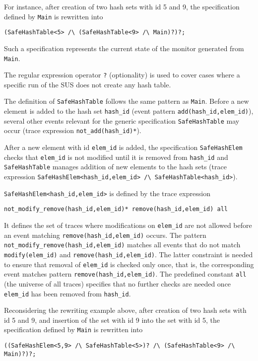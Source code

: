 For instance, after creation of two hash sets with id 5 and 9, the specification defined by \lstinline{Main} is rewritten into
\begin{lstlisting}[basicstyle=\ttfamily\scriptsize]
(SafeHashTable<5> /\ (SafeHashTable<9> /\ Main)?)?;
\end{lstlisting}
Such a specification represents the current state of the monitor generated from \lstinline{Main}.

The regular expression operator \lstinline{?} (optionality)
is used to cover cases where a specific run of the SUS does not create any hash table.

The definition of \lstinline{SafeHashTable} follows the same pattern as \lstinline{Main}.
Before a new element is added to the hash set \lstinline{hash_id} (event pattern \lstinline{add(hash_id,elem_id)}), several other events relevant for the generic specification \lstinline{SafeHashTable} may occur (trace expression \lstinline{not_add(hash_id)*}).

After a new element with id \lstinline{elem_id} is added, the specification \lstinline{SafeHashElem} checks that \lstinline{elem_id} is not modified
until it is removed from \lstinline{hash_id} and \lstinline{SafeHashTable} manages addition of new elements to the hash sets
(trace expression \lstinline{SafeHashElem<hash_id,elem_id> /\ SafeHashTable<hash_id>}).

\lstinline{SafeHashElem<hash_id,elem_id>} is defined by the trace expression
\begin{lstlisting}
not_modify_remove(hash_id,elem_id)* remove(hash_id,elem_id) all
\end{lstlisting}

It defines the set of traces where modifications on \lstinline{elem_id} are not allowed before an event matching \lstinline{remove(hash_id,elem_id)}
occurs. The pattern \lstinline{not_modify_remove(hash_id,elem_id)} matches all events that do not match \lstinline{modify(elem_id)} and \lstinline{remove(hash_id,elem_id)}. The latter constraint is needed to ensure that removal of \lstinline{elem_id} is checked only once, that is, the corresponding event matches pattern \lstinline{remove(hash_id,elem_id)}. 
The predefined constant \lstinline{all} (the universe of all traces) specifies that no further checks are needed once \lstinline{elem_id} has been removed from \lstinline{hash_id}.

Reconsidering the rewriting example above, after creation of two hash sets with id 5 and 9, and insertion
of the set with id 9 into the set with id 5, the specification defined by \lstinline{Main} is rewritten into
\begin{lstlisting}[basicstyle=\ttfamily\scriptsize]
((SafeHashElem<5,9> /\ SafeHashTable<5>)? /\ (SafeHashTable<9> /\ Main)?)?;
\end{lstlisting}

